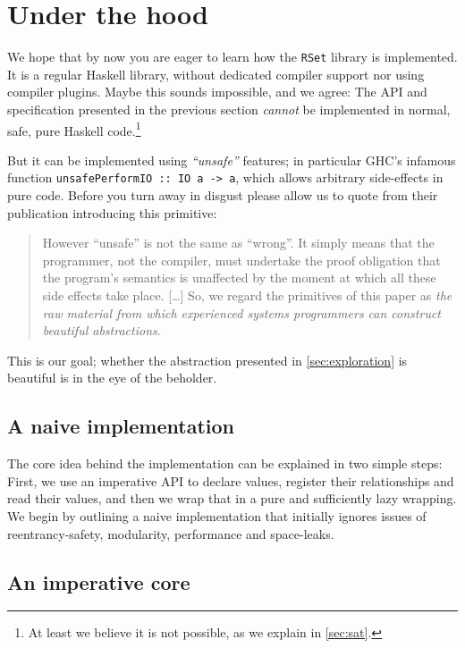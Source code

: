 \documentclass[manuscript,anonymous,screen,acmsmall]{acmart}
\begin{document}
\section{Under the hood}\label{sec:impl}

We hope that by now you are eager to learn how the \verb|RSet| library is implemented. It is a regular Haskell library, without dedicated compiler support nor using compiler plugins. Maybe this sounds impossible, and we agree: The API and specification presented in the previous section \emph{cannot} be implemented in normal, safe, pure Haskell code.\footnote{At least we believe it is not possible, as we explain in \cref{sec:sat}.}

But it can be implemented using \emph{“unsafe”} features; in particular GHC's infamous function \verb|unsafePerformIO :: IO a -> a|, which allows arbitrary side-effects in pure code. Before you turn away in disgust please allow us to quote \citet{unsafePerformIO} from their publication introducing this primitive:
\begin{quote}
However “unsafe” is not the same as “wrong”. It simply means that the programmer, not the compiler, must undertake the proof obligation that the program's semantics is unaffected by the moment at which all these side effects take place. [\ldots]
So, we regard the primitives of this paper as \emph{the raw material from which experienced systems programmers can construct beautiful abstractions}.
\end{quote}
This is our goal; whether the abstraction presented in \cref{sec:exploration} is beautiful is in the eye of the beholder.

\subsection{A naive implementation}

The core idea behind the implementation can be explained in two simple steps: First, we use an imperative API to declare values, register their relationships and read their values, and then we wrap that in a pure and sufficiently lazy wrapping. We begin by outlining a naive implementation that initially ignores issues of reentrancy-safety, modularity, performance and space-leaks.

\subsection{An imperative core}\label{sec:impcore}
\end{document}

